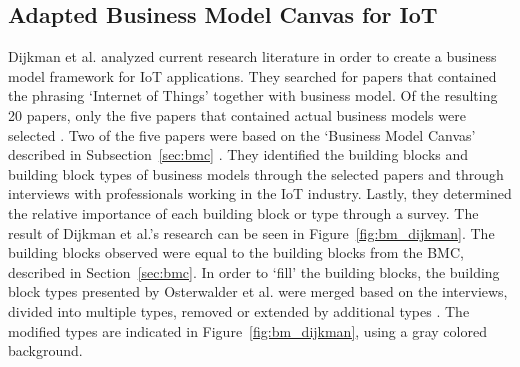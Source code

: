 	\subsection{Adapted Business Model Canvas for IoT}
	\vspace{-1em}
		Dijkman et al. \cite{dijkman} analyzed current research literature in order to create a business model framework for IoT applications. They searched for papers that contained the phrasing `Internet of Things' together with business model. Of the resulting 20 papers, only the five papers that contained actual business models were selected \cite{bucherer} \cite{fan} \cite{lixu} \cite{liu} \cite{sun}. Two of the five papers were based on the `Business Model Canvas' described in Subsection~\ref{sec:bmc} \cite{bucherer} \cite{sun}. They identified the building blocks and building block types of business models through the selected papers and through interviews with professionals working in the IoT industry. Lastly, they determined the relative importance of each building block or type through a survey. The result of Dijkman et al.'s research can be seen in Figure~\ref{fig:bm_dijkman}. The building blocks observed were equal to the building blocks from the BMC, described in Section~\ref{sec:bmc}. In order to `fill' the building blocks, the building block types presented by Osterwalder et al. were merged based on the interviews, divided into multiple types, removed or extended by additional types \cite{osterwalder2010} \cite{dijkman}. The modified types are indicated in Figure~\ref{fig:bm_dijkman}, using a gray colored background. 

